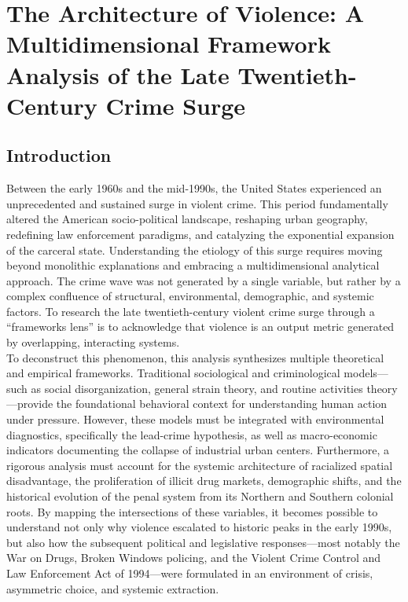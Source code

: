 \documentclass[
]{article}
\author{Emmanuel Theodore}
\date{}
\begin{document}
\section{\texorpdfstring{\textbf{The Architecture of Violence: A
Multidimensional Framework Analysis of the Late Twentieth-Century Crime
Surge}}{The Architecture of Violence: A Multidimensional Framework Analysis of the Late Twentieth-Century Crime Surge}}\label{the-architecture-of-violence-a-multidimensional-framework-analysis-of-the-late-twentieth-century-crime-surge}

\subsection{\texorpdfstring{\textbf{Introduction}}{Introduction}}\label{introduction}

Between the early 1960s and the mid-1990s, the United States experienced
an unprecedented and sustained surge in violent crime. This period
fundamentally altered the American socio-political landscape, reshaping
urban geography, redefining law enforcement paradigms, and catalyzing
the exponential expansion of the carceral state. Understanding the
etiology of this surge requires moving beyond monolithic explanations
and embracing a multidimensional analytical approach. The crime wave was
not generated by a single variable, but rather by a complex confluence
of structural, environmental, demographic, and systemic factors. To
research the late twentieth-century violent crime surge through a
``frameworks lens'' is to acknowledge that violence is an output metric
generated by overlapping, interacting systems.\\
To deconstruct this phenomenon, this analysis synthesizes multiple
theoretical and empirical frameworks. Traditional sociological and
criminological models---such as social disorganization, general strain
theory, and routine activities theory---provide the foundational
behavioral context for understanding human action under pressure.
However, these models must be integrated with environmental diagnostics,
specifically the lead-crime hypothesis, as well as macro-economic
indicators documenting the collapse of industrial urban centers.
Furthermore, a rigorous analysis must account for the systemic
architecture of racialized spatial disadvantage, the proliferation of
illicit drug markets, demographic shifts, and the historical evolution
of the penal system from its Northern and Southern colonial roots. By
mapping the intersections of these variables, it becomes possible to
understand not only why violence escalated to historic peaks in the
early 1990s, but also how the subsequent political and legislative
responses---most notably the War on Drugs, Broken Windows policing, and
the Violent Crime Control and Law Enforcement Act of 1994---were
formulated in an environment of crisis, asymmetric choice, and systemic
extraction.
\end{document}
